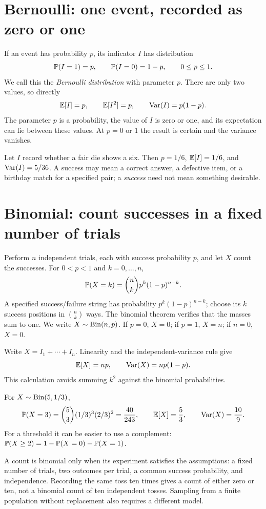 \section{Bernoulli: one event, recorded as zero or one}
\label{sec:bernoulli}

If an event has probability $p$, its indicator $I$ has distribution
\[
 \P(I=1)=p,\qquad \P(I=0)=1-p,\qquad 0\le p\le1.
\]
We call this the \emph{Bernoulli distribution} with parameter $p$.
There are only two values, so directly
\[
 \E[I]=p,\qquad \E[I^2]=p,\qquad \Var(I)=p(1-p).
\]
The parameter $p$ is a probability, the value of $I$ is zero or one,
and its expectation can lie between these values.
At $p=0$ or $1$ the result is certain and the variance vanishes.

\begin{example}
Let $I$ record whether a fair die shows a six. Then $p=1/6$,
$\E[I]=1/6$, and $\Var(I)=5/36$.
A success may mean a correct answer, a defective item, or a birthday
match for a specified pair; a \emph{success} need not mean something desirable.
\end{example}

\section{Binomial: count successes in a fixed number of trials}
\label{sec:binomial}

Perform $n$ independent trials, each with success probability $p$,
and let $X$ count the successes. For $0<p<1$ and $k=0,\ldots,n$,
\[
 \P(X=k)=\binom nkp^k(1-p)^{n-k}.
\]
A specified success/failure string has probability $p^k(1-p)^{n-k}$;
choose its $k$ success positions in $\binom nk$ ways.
The binomial theorem verifies that the masses sum to one.
We write $X\sim\Bin(n,p)$.
If $p=0$, $X=0$; if $p=1$, $X=n$; if $n=0$, $X=0$.

Write $X=I_1+\cdots+I_n$. Linearity and the independent-variance rule give
\[
 \E[X]=np,\qquad \Var(X)=np(1-p).
\]
This calculation avoids summing $k^2$ against the binomial probabilities.

\begin{example}
For $X\sim\Bin(5,1/3)$,
\[
 \P(X=3)=\binom53(1/3)^3(2/3)^2=\frac{40}{243},
 \qquad \E[X]=\frac53,\qquad \Var(X)=\frac{10}{9}.
\]
For a threshold it can be easier to use a complement:
$\P(X\ge2)=1-\P(X=0)-\P(X=1)$.
\end{example}

\begin{warningbox}
A count is binomial only when its experiment satisfies the assumptions:
a fixed number of trials, two outcomes per trial, a common success
probability, and independence.
Recording the same toss ten times gives a count of either zero or ten,
not a binomial count of ten independent tosses.
Sampling from a finite population without replacement also requires
a different model.
\end{warningbox}

